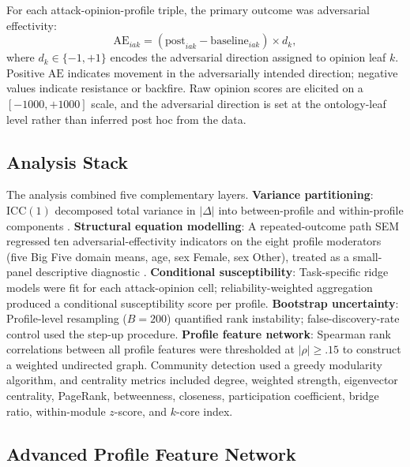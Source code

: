 \documentclass[11pt,a4paper]{article}
\begin{document}
For each attack-opinion-profile triple, the primary outcome was adversarial effectivity:
\begin{equation}
\mathrm{AE}_{iak} = (\mathrm{post}_{iak} - \mathrm{baseline}_{iak}) \times d_k,
\end{equation}
where $d_k \in \{-1,+1\}$ encodes the adversarial direction assigned to opinion leaf $k$. Positive $\mathrm{AE}$ indicates movement in the adversarially intended direction; negative values indicate resistance or backfire. Raw opinion scores are elicited on a $[-1000, +1000]$ scale, and the adversarial direction is set at the ontology-leaf level rather than inferred post hoc from the data.

\subsection{Analysis Stack}

The analysis combined five complementary layers. \textbf{Variance partitioning}: $\mathrm{ICC}(1)$ decomposed total variance in $|\Delta|$ into between-profile and within-profile components \citep{shrout1979intraclass}. \textbf{Structural equation modelling}: A repeated-outcome path SEM regressed ten adversarial-effectivity indicators on the eight profile moderators (five Big Five domain means, age, sex Female, sex Other), treated as a small-panel descriptive diagnostic \citep{rosseel2012lavaan}. \textbf{Conditional susceptibility}: Task-specific ridge models were fit for each attack-opinion cell; reliability-weighted aggregation produced a conditional susceptibility score per profile. \textbf{Bootstrap uncertainty}: Profile-level resampling ($B = 200$) quantified rank instability; false-discovery-rate control used the \citet{benjamini1995controlling} step-up procedure. \textbf{Profile feature network}: Spearman rank correlations between all profile features were thresholded at $|\rho| \ge .15$ to construct a weighted undirected graph. Community detection used a greedy modularity algorithm, and centrality metrics included degree, weighted strength, eigenvector centrality, PageRank, betweenness, closeness, participation coefficient, bridge ratio, within-module $z$-score, and $k$-core index.

\subsection{Advanced Profile Feature Network}
\end{document}
